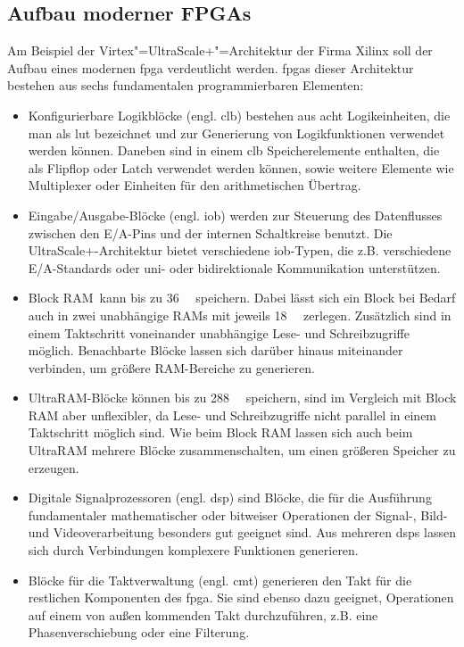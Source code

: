 \subsection{Aufbau moderner FPGAs}\label{fpga:ueberblick:aufbau}

Am Beispiel der Virtex"=UltraScale+"=Architektur der Firma Xilinx soll der
Aufbau eines modernen \gls{fpga} verdeutlicht werden. \gls{fpga}s dieser
Architektur bestehen aus sechs fundamentalen programmierbaren Elementen:
\begin{itemize}
    \item Konfigurierbare Logikblöcke (engl. \gls{clb}) bestehen aus acht
          Logikeinheiten, die man als \gls{lut} bezeichnet und zur
          Generierung von Logikfunktionen verwendet werden können. Daneben sind
          in einem \gls{clb} Speicherelemente enthalten, die als Flipflop oder
          Latch verwendet werden können, sowie weitere Elemente wie Multiplexer
          oder Einheiten für den arithmetischen Übertrag.
          \cite[vgl.][6]{ultrascaleclb2017}
    \item Eingabe/Ausgabe-Blöcke (engl. \gls{iob}) werden zur Steuerung des
          Datenflusses zwischen den E/A-Pins und der internen Schaltkreise
          benutzt. Die UltraScale+-Architektur bietet verschiedene
          \gls{iob}-Typen, die z.B. verschiedene E/A-Standards oder uni- oder
          bidirektionale Kommunikation unterstützen. \cite[vgl. die
          ausführliche E/A"=Beschreibung in][Kapitel 1 und 2]{ultrascaleio2019}
    \item \glqq Block RAM\grqq\ kann bis zu \SI{36}{\kilo\bit} speichern. Dabei
          lässt sich ein Block bei Bedarf auch in zwei unabhängige RAMs mit
          jeweils \SI{18}{\kilo\bit} zerlegen. Zusätzlich sind in einem
          Taktschritt voneinander unabhängige Lese- und Schreibzugriffe möglich.
          Benachbarte Blöcke lassen sich darüber hinaus miteinander verbinden,
          um größere RAM-Bereiche zu generieren.
          \cite[vgl.][6]{ultrascalemem2019}
    \item UltraRAM-Blöcke können bis zu \SI{288}{\kilo\bit} speichern, sind im
          Vergleich mit Block RAM aber unflexibler, da Lese- und Schreibzugriffe
          nicht parallel in einem Taktschritt möglich sind. Wie beim Block RAM
          lassen sich auch beim UltraRAM mehrere Blöcke zusammenschalten, um
          einen größeren Speicher zu erzeugen.
          \cite[vgl.][92--94]{ultrascalemem2019}
    \item Digitale Signalprozessoren (engl. \gls{dsp}) sind Blöcke, die für die
          Ausführung fundamentaler mathematischer oder bitweiser Operationen der
          Signal-, Bild- und Videoverarbeitung besonders gut geeignet sind. Aus
          mehreren \gls{dsp}s lassen sich durch Verbindungen komplexere
          Funktionen generieren. \cite[vgl.][7--8]{ultrascaledsp2019}
    \item Blöcke für die Taktverwaltung (engl. \gls{cmt}) generieren den Takt
          für die restlichen Komponenten des \gls{fpga}. Sie sind ebenso dazu
          geeignet, Operationen auf einem von außen kommenden Takt
          durchzuführen, z.B. eine Phasenverschiebung oder eine Filterung.
          \cite[vgl.][35--40]{ultrascaleclock2018}
\end{itemize}
